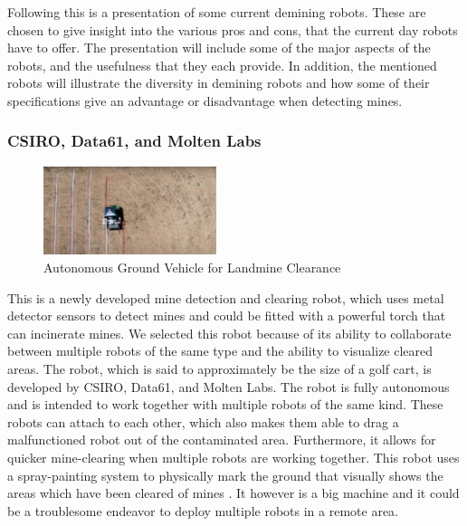 Following this is a presentation of some current demining robots. These are chosen to give insight into the various pros and cons, that the current day robots have to offer. The presentation will include some of the major aspects of the robots, and the usefulness that they each provide. In addition, the mentioned robots will illustrate the diversity in demining robots and how some of their specifications give an advantage or disadvantage when detecting mines.

\newpage

\subsubsection*{CSIRO, Data61, and Molten Labs}

\begin{figure}
    \centering
      \includegraphics[width=0.45\textwidth]{00 - Images/autonomous_ground_vehicle_for_landmine_clearance.jpg}
  \caption{Autonomous Ground Vehicle for Landmine Clearance \cite{CSIRO2020}}
  \label{fig:autonomous_ground_vehicle_for_landmine_clearance}
\end{figure}
This is a newly developed mine detection and clearing robot, which uses metal detector sensors to detect mines and could be fitted with a powerful torch that can incinerate mines. We selected this robot because of its ability to collaborate between multiple robots of the same type and the ability to visualize cleared areas. The robot, which is said to approximately be the size of a golf cart, is developed by CSIRO, Data61, and Molten Labs. The robot is fully autonomous and is intended to work together with multiple robots of the same kind. These robots can attach to each other, which also makes them able to drag a malfunctioned robot out of the contaminated area. Furthermore, it allows for quicker mine-clearing when multiple robots are working together. This robot uses a spray-painting system to physically mark the ground that visually shows the areas which have been cleared of mines \cite{CSIRO2020}. It however is a big machine and it could be a troublesome endeavor to deploy multiple robots in a remote area.

